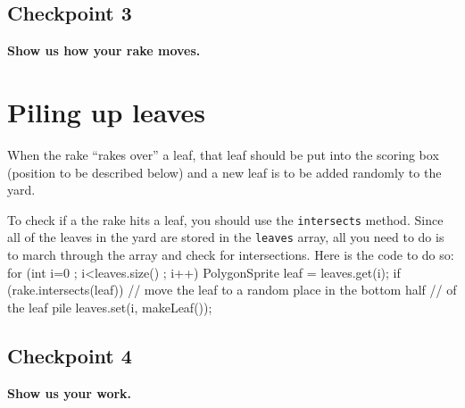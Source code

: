 \documentclass[12pt]{article}
\newenvironment{qv}%
  {\quote
   \verbatim}%
  {\endverbatim
   \endquote}
\newcommand{\code}{\texttt}
\begin{document}
\subsection*{Checkpoint 3}
{\bf
Show us how your rake moves.
}

\section*{Piling up leaves}

When the rake ``rakes over'' a leaf, that
leaf should be put into the scoring box (position to be described
below) and a new leaf is to be added randomly to the yard.

To check if a the rake hits a leaf, you should use
the \code{intersects} method.
Since all of the leaves in the yard are stored
in the \code{leaves} array,
all you need to do is to march through the array
and check for intersections.
Here is the code to do so:
\begin{qv}
for (int i=0 ; i<leaves.size() ; i++) {
  PolygonSprite leaf = leaves.get(i);
  if (rake.intersects(leaf)) {
    // move the leaf to a random place in the bottom half
    // of the leaf pile
    leaves.set(i, makeLeaf());
  }  
}
\end{qv}

\subsection*{Checkpoint 4}
{\bf
Show us your work.
}
\end{document}
